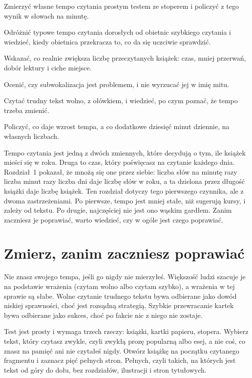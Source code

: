 
\begin{cele}
  \item Zmierzyć własne tempo czytania prostym testem ze stoperem i policzyć z tego wynik w słowach na minutę.
  \item Odróżnić typowe tempo czytania dorosłych od obietnic szybkiego czytania i wiedzieć, kiedy obietnica przekracza to, co da się uczciwie sprawdzić.
  \item Wskazać, co realnie zwiększa liczbę przeczytanych książek: czas, mniej przerwań, dobór lektury i ciche miejsce.
  \item Ocenić, czy subwokalizacja jest problemem, i nie wyrzucać jej w imię mitu.
  \item Czytać trudny tekst wolno, z ołówkiem, i wiedzieć, po czym poznać, że tempo trzeba zmienić.
  \item Policzyć, co daje wzrost tempa, a co dodatkowe dziesięć minut dziennie, na własnych liczbach.
\end{cele}

Tempo czytania jest jedną z dwóch zmiennych, które decydują o tym, ile książek mieści się w roku. Druga to czas, który poświęcasz na czytanie każdego dnia. Rozdział~1 pokazał, że mnożą się one przez siebie: liczba słów na minutę razy liczba minut razy liczba dni daje liczbę słów w roku, a ta dzielona przez długość książki daje liczbę książek. Ten rozdział dotyczy tego pierwszego czynnika, ale z dwoma zastrzeżeniami. Po pierwsze, tempo jest mniej stałe, niż sugerują kursy, i zależy od tekstu. Po drugie, najczęściej nie jest ono wąskim gardłem. Zanim zaczniesz je poprawiać, warto wiedzieć, czy w ogóle jest czego poprawiać.

\section{Zmierz, zanim zaczniesz poprawiać}

Nie znasz swojego tempa, jeśli go nigdy nie mierzyłeś. Większość ludzi szacuje je na podstawie wrażenia (\glqq czytam wolno\grqq{} albo \glqq czytam szybko\grqq{}), a wrażenia w tej sprawie są słabe. Wolne czytanie trudnego tekstu bywa odbierane jako dowód niskiej sprawności, choć jest rozsądną strategią. Szybkie przewracanie kartek bywa odbierane jako sukces, choć po fakcie nic z niego nie zostaje.

Test jest prosty i wymaga trzech rzeczy: książki, kartki papieru, stopera. Wybierz tekst, który czytasz zwykle, czyli zwykłą prozę popularną albo esej, a nie coś, co znasz na pamięć ani nie czytałeś nigdy. Otwórz książkę na początku czytanego fragmentu i zaznacz pięć pełnych stron. Pełnych, czyli takich, na których jest tekst od góry do dołu, bez rozdziałów, ilustracji i stron tytułowych.

